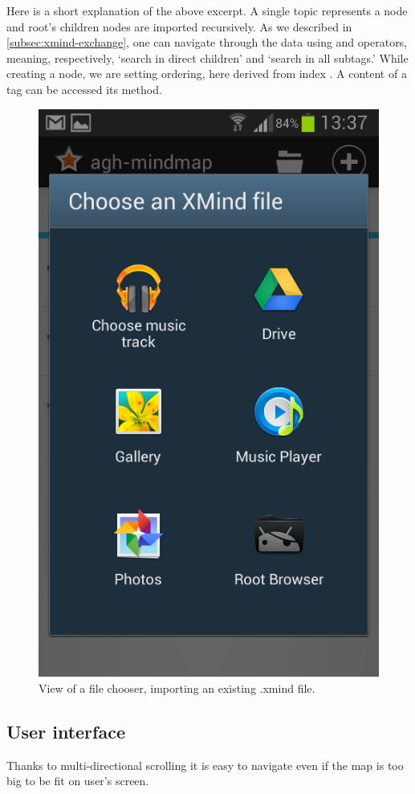 Here is a short explanation of the above excerpt. A single topic represents a node and root's children nodes are imported recursively. As we described in \cref{subsec:xmind-exchange}, one can navigate through the data using \inlinecode{\textbackslash} and \inlinecode{\textbackslash\textbackslash} operators, meaning, respectively, `search in direct children' and `search in all subtags.' While creating a node, we are setting ordering, here derived from index . A content of a tag can be accessed its  method.

\begin{figure}[h]
	\centering
	\includegraphics[width=.5\textwidth]{graphics-screenshot-import}
	\caption{View of a file chooser, importing an existing .xmind file.}
	\label{fig:screen-filechooser}
\end{figure}

\subsection{User interface}
\label{subsec:ui}
Thanks to multi-directional scrolling it is easy to navigate even if the map is too big to be fit on user's screen.

